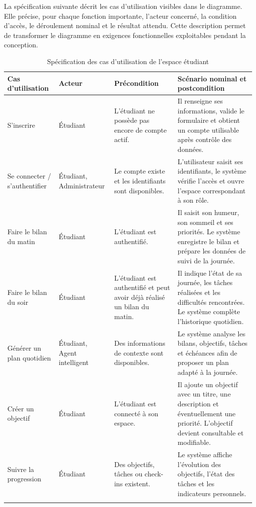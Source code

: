\documentclass{rapportENSET}
\begin{document}
La spécification suivante décrit les cas d'utilisation visibles dans le diagramme. Elle précise, pour chaque fonction importante, l'acteur concerné, la condition d'accès, le déroulement nominal et le résultat attendu. Cette description permet de transformer le diagramme en exigences fonctionnelles exploitables pendant la conception.

\begin{longtable}{@{}L{0.20\textwidth}L{0.18\textwidth}L{0.25\textwidth}L{0.27\textwidth}@{}}
\toprule
\textbf{Cas d'utilisation} & \textbf{Acteur} & \textbf{Précondition} & \textbf{Scénario nominal et postcondition} \\
\midrule
\endhead
S'inscrire & Étudiant & L'étudiant ne possède pas encore de compte actif. & Il renseigne ses informations, valide le formulaire et obtient un compte utilisable après contrôle des données. \\
Se connecter / s'authentifier & Étudiant, Administrateur & Le compte existe et les identifiants sont disponibles. & L'utilisateur saisit ses identifiants, le système vérifie l'accès et ouvre l'espace correspondant à son rôle. \\
Faire le bilan du matin & Étudiant & L'étudiant est authentifié. & Il saisit son humeur, son sommeil et ses priorités. Le système enregistre le bilan et prépare les données de suivi de la journée. \\
Faire le bilan du soir & Étudiant & L'étudiant est authentifié et peut avoir déjà réalisé un bilan du matin. & Il indique l'état de sa journée, les tâches réalisées et les difficultés rencontrées. Le système complète l'historique quotidien. \\
Générer un plan quotidien & Étudiant, Agent intelligent & Des informations de contexte sont disponibles. & Le système analyse les bilans, objectifs, tâches et échéances afin de proposer un plan adapté à la journée. \\
Créer un objectif & Étudiant & L'étudiant est connecté à son espace. & Il ajoute un objectif avec un titre, une description et éventuellement une priorité. L'objectif devient consultable et modifiable. \\
Suivre la progression & Étudiant & Des objectifs, tâches ou check-ins existent. & Le système affiche l'évolution des objectifs, l'état des tâches et les indicateurs personnels. \\
\bottomrule
\caption{Spécification des cas d'utilisation de l'espace étudiant}
\end{longtable}
\end{document}
